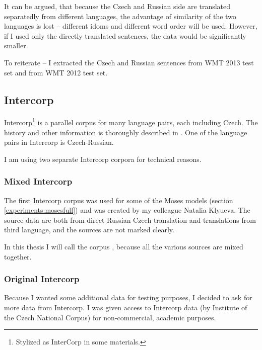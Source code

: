 It can be argued, that because the Czech and Russian side are translated separatedly from different languages, the advantage of similarity of the two languages is lost -- different idoms and different word order will be used. 
However, if I used only the directly translated sentences, the data would be significantly smaller. 


To reiterate -- I extracted the Czech and Russian sentences from WMT 2013 test set and from WMT 2012 test set.

\subsection{Intercorp}
\label{intercorp_p1}
Intercorp\footnote{Stylized as InterCorp in some materials.} is a parallel corpus for many language pairs, each including Czech. The history and other information is thoroughly described in \cite{intercorp}. One of the language pairs in Intercorp is Czech-Russían.

I am using two separate Intercorp corpora for technical reasons. 

\subsubsection{Mixed Intercorp}
The first Intercorp corpus was used for some of the Moses models (section \ref{experiments:mosesfull}) and was created by my colleague Natalia Klyueva. 
The source data are both from direct Russian-Czech translation and translations from third language, and the sources are not marked clearly.

In this thesis I will call the corpus , because all the various sources are mixed together.

\subsubsection{Original Intercorp}

Because I wanted some additional data for testing purposes, I decided to ask for more data from Intercorp. 
I was  given access to  Intercorp data (by Institute of the Czech National Corpus) for non-commercial, academic purposes.

